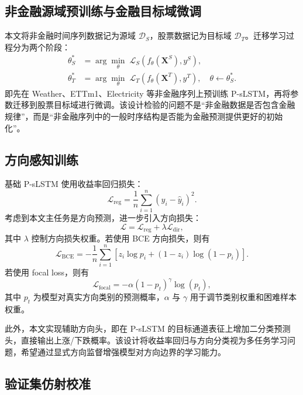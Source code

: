 \documentclass[UTF8,a4paper,twocolumn]{ctexart}
\begin{document}
\subsection{非金融源域预训练与金融目标域微调}

本文将非金融时间序列数据记为源域 $\mathcal{D}_{S}$，股票数据记为目标域 $\mathcal{D}_{T}$。迁移学习过程分为两个阶段：
\begin{align}
  \theta^{*}_{S} &= \arg\min_{\theta}\;\mathcal{L}_{S}\left(f_{\theta}(\bm{X}^{S}),y^{S}\right), \\
  \theta^{*}_{T} &= \arg\min_{\theta}\;\mathcal{L}_{T}\left(f_{\theta}(\bm{X}^{T}),y^{T}\right),\quad \theta\leftarrow \theta^{*}_{S}.
\end{align}
即先在 Weather、ETTm1、Electricity 等非金融序列上预训练 P-sLSTM，再将参数迁移到股票目标域进行微调。该设计检验的问题不是“非金融数据是否包含金融规律”，而是“非金融序列中的一般时序结构是否能为金融预测提供更好的初始化”。

\subsection{方向感知训练}

基础 P-sLSTM 使用收益率回归损失：
\begin{equation}
  \mathcal{L}_{\mathrm{reg}}=\frac{1}{n}\sum_{i=1}^{n}\left(y_i-\hat y_i\right)^2.
\end{equation}
考虑到本文主任务是方向预测，进一步引入方向损失：
\begin{equation}
  \mathcal{L}=\mathcal{L}_{\mathrm{reg}}+\lambda\mathcal{L}_{\mathrm{dir}},
\end{equation}
其中 $\lambda$ 控制方向损失权重。若使用 BCE 方向损失，则有
\begin{equation}
  \mathcal{L}_{\mathrm{BCE}}=-\frac{1}{n}\sum_{i=1}^{n}\left[z_i\log p_i+(1-z_i)\log(1-p_i)\right].
\end{equation}
若使用 focal loss，则有
\begin{equation}
  \mathcal{L}_{\mathrm{focal}}=-\alpha(1-p_t)^{\gamma}\log(p_t),
\end{equation}
其中 $p_t$ 为模型对真实方向类别的预测概率，$\alpha$ 与 $\gamma$ 用于调节类别权重和困难样本权重。

此外，本文实现辅助方向头，即在 P-sLSTM 的目标通道表征上增加二分类预测头，直接输出上涨/下跌概率。该设计将收益率回归与方向分类视为多任务学习问题，希望通过显式方向监督增强模型对方向边界的学习能力。

\subsection{验证集仿射校准}
\end{document}

